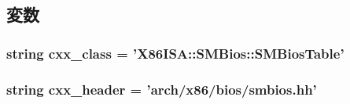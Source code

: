 \subsection{変数}
\hypertarget{classSMBios_1_1X86SMBiosSMBiosTable_a58cd55cd4023648e138237cfc0822ae3}{
\subsubsection[{cxx\_\-class}]{\setlength{\rightskip}{0pt plus 5cm}string {\bf cxx\_\-class} = '{\bf X86ISA::SMBios::SMBiosTable}'}}
\label{classSMBios_1_1X86SMBiosSMBiosTable_a58cd55cd4023648e138237cfc0822ae3}
\hypertarget{classSMBios_1_1X86SMBiosSMBiosTable_a17da7064bc5c518791f0c891eff05fda}{
\subsubsection[{cxx\_\-header}]{\setlength{\rightskip}{0pt plus 5cm}string {\bf cxx\_\-header} = 'arch/x86/bios/smbios.hh'}}
\label{classSMBios_1_1X86SMBiosSMBiosTable_a17da7064bc5c518791f0c891eff05fda}


